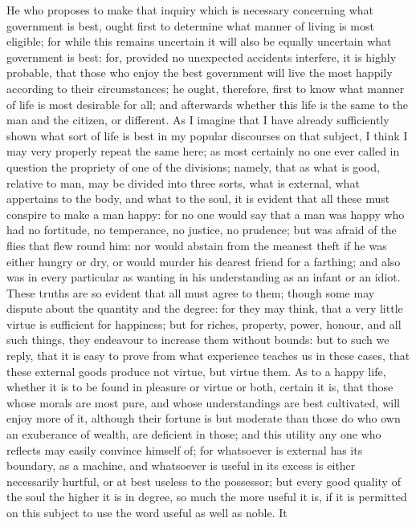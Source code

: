 He who proposes to make that inquiry which is necessary concerning what
government is best, ought first to determine what manner of living is most
eligible; for while this remains uncertain it will also be equally
uncertain what government is best: for, provided no unexpected accidents
interfere, it is highly probable, that those who enjoy the best government
will live the most happily according to their circumstances; he ought,
therefore, first to know what manner of life is most desirable for all;
and afterwards whether this life is the same to the man and the citizen,
or different. As I imagine that I have already sufficiently shown what
sort of life is best in my popular discourses on that subject, I think I
may very properly repeat the same here; as most certainly no one ever
called in question the propriety of one of the divisions; namely, that as
what is good, relative to man, may be divided into three sorts, what is
external, what appertains to the body, and what to the soul, it is evident
that all these must conspire to make a man happy: for no one would say
that a man was happy who had no fortitude, no temperance, no justice, no
prudence; but was afraid of the flies that flew round him: nor would
abstain from the meanest theft if he was either hungry or dry, or would
murder his dearest friend for a farthing; and also was in every particular
as wanting in his understanding as an infant or an idiot. These truths are
so evident that all must agree to them; though some may dispute about the
quantity and the degree: for they may think, that a very little virtue is
sufficient for happiness; but for riches, property, power, honour, and all
such things, they endeavour to increase them without bounds: but to such
we reply, that it is easy to prove from what experience teaches us in
these cases, that these external goods produce not virtue, but virtue
them. As to a happy life, whether it is to be found in pleasure or virtue
or both, certain it is, that those whose morals are most pure, and whose
understandings are best cultivated, will enjoy more of it, although their
fortune is but moderate than those do who own an exuberance of wealth, are
deficient in those; and this utility any one who reflects may easily
convince himself of; for whatsoever is external has its boundary, as a
machine, and whatsoever is useful in its excess is either necessarily
hurtful, or at best useless to the possessor; but every good quality of
the soul the higher it is in degree, so much the more useful it is, if it
is permitted on this subject to use the word useful as well as noble. It
